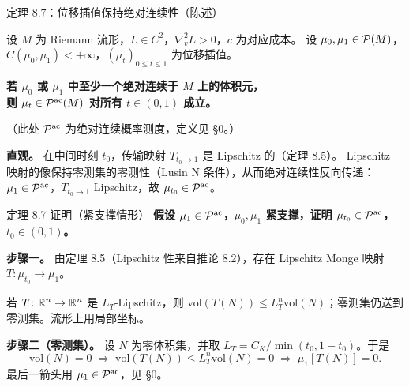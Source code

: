 \begin{frame}{定理 8.7：位移插值保持绝对连续性（陈述）}

  设 $M$ 为 Riemann 流形，$L\in C^{2}$，$\nabla_{v}^{2}L>0$，$c$ 为对应成本。
  设 $\mu_{0},\mu_{1}\in\mathcal{P}(M)$，$C(\mu_{0},\mu_{1})<+\infty$，$(\mu_{t})_{0\le t\le 1}$ 为位移插值。

  \begin{center}
  \textbf{若 $\mu_{0}$ 或 $\mu_{1}$ 中至少一个绝对连续于 $M$ 上的体积元，}\\[4pt]
  \textbf{则 $\mu_{t}\in\mathcal{P}^{\mathrm{ac}}(M)$ 对所有 $t\in(0,1)$ 成立。}
  \end{center}
  {\small （此处 $\mathcal{P}^{\mathrm{ac}}$ 为绝对连续概率测度，定义见 §0。）}

  \textbf{直观。} 在中间时刻 $t_0$，传输映射 $T_{t_0\to 1}$ 是 Lipschitz 的（定理 8.5）。
  Lipschitz 映射的像保持零测集的零测性（Lusin N 条件），从而绝对连续性反向传递：
  $\mu_1\in\mathcal{P}^{\mathrm{ac}}$，$T_{t_0\to 1}$ Lipschitz，故 $\mu_{t_0}\in\mathcal{P}^{\mathrm{ac}}$。

\end{frame}

\begin{frame}{定理 8.7 证明（紧支撑情形）}
  \textbf{假设 $\mu_{1}\in\mathcal{P}^{\mathrm{ac}}$，$\mu_{0},\mu_{1}$ 紧支撑，证明 $\mu_{t_{0}}\in\mathcal{P}^{\mathrm{ac}}$，$t_{0}\in(0,1)$。}\proofskipnote

  \textbf{步骤一。} 由定理 8.5（Lipschitz 性来自推论 8.2），存在 Lipschitz Monge 映射 $T\colon\mu_{t_{0}}\to\mu_{1}$。

  若 $T\colon\mathbb{R}^{n}\to\mathbb{R}^{n}$ 是 $L_{T}$-Lipschitz，则
  $\mathrm{vol}(T(N))\le L_{T}^{n}\mathrm{vol}(N)$；零测集仍送到零测集。流形上用局部坐标。

  \textbf{步骤二（零测集）。} 设 $N$ 为零体积集，并取 $L_{T}=C_{K}/\min(t_{0},1-t_{0})$。于是
  \[
    \mathrm{vol}(N)=0
    \;\Longrightarrow\;
    \mathrm{vol}(T(N))\le L_{T}^{n}\mathrm{vol}(N)=0
    \;\Longrightarrow\;
    \mu_{1}[T(N)]=0.
  \]
  最后一箭头用 $\mu_{1}\in\mathcal{P}^{\mathrm{ac}}$，见 §0。

\end{frame}

